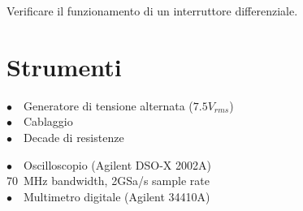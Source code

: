 Verificare il funzionamento di un interruttore differenziale.

\section{Strumenti}
%
\phantom{porcodio!}
\noindent
\begin{minipage}{.5\linewidth}
$\bullet \quad$Generatore di tensione alternata ($7.5 V_{rms}$)\\
$\bullet \quad$Cablaggio\\
$\bullet \quad$Decade di resistenze\\
\end{minipage}%
\begin{minipage}{.5\linewidth}
$\bullet \quad$Oscilloscopio (Agilent DSO-X 2002A)\\
\phantom{xxxx}\SI{70}{\mega\hertz} bandwidth, 2GSa/s sample rate\\
$\bullet \quad$Multimetro digitale (Agilent 34410A)\\
\end{minipage}